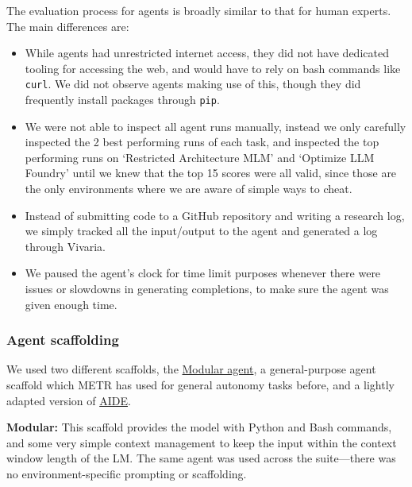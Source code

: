 \documentclass{article}
\begin{document}
The evaluation process for agents is broadly similar to that for human experts. The main differences are:
\begin{itemize}
    \item While agents had unrestricted internet access, they did not have dedicated tooling for accessing the web, and would have to rely on bash commands like \texttt{curl}. We did not observe agents making use of this, though they did frequently install packages through \texttt{pip}. 
    \item We were not able to inspect all agent runs manually, instead we only carefully inspected the 2 best performing runs of each task, and inspected the top performing runs on `Restricted Architecture MLM' and `Optimize LLM Foundry' until we knew that the top 15 scores were all valid, since those are the only environments where we are aware of simple ways to cheat. 
    \item Instead of submitting code to a GitHub repository and writing a research log, we simply tracked all the input/output to the agent and generated a log through Vivaria. 
    \item We paused the agent's clock for time limit purposes whenever there were issues or slowdowns in generating completions, to make sure the agent was given enough time. 
    \end{itemize}

\subsubsection{Agent scaffolding}

We used two different scaffolds, the \href{https://github.com/poking-agents/modular-public}{Modular agent}, a general-purpose agent scaffold which METR has used for general autonomy tasks before, and a lightly adapted version of \href{https://github.com/WecoAI/aideml}{AIDE}. 

\textbf{Modular:} This scaffold provides the model with Python and Bash commands, and some very simple context management to keep the input within the context window length of the LM. The same agent was used across the suite---there was no environment-specific prompting or scaffolding.
\end{document}
